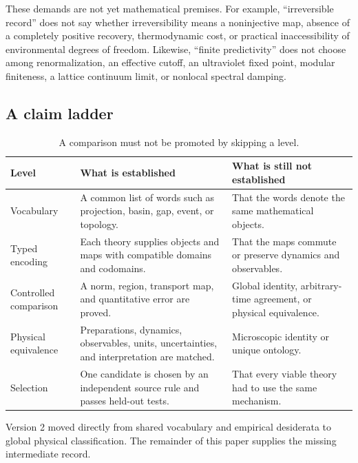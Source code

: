 \documentclass[11pt]{article}
\theoremstyle{definition}
\theoremstyle{remark}
\begin{document}
These demands are not yet mathematical premises. For example,
``irreversible record'' does not say whether irreversibility means a
noninjective map, absence of a completely positive recovery, thermodynamic cost,
or practical inaccessibility of environmental degrees of freedom. Likewise,
``finite predictivity'' does not choose among renormalization, an effective
cutoff, an ultraviolet fixed point, modular finiteness, a lattice continuum
limit, or nonlocal spectral damping.

\subsection{A claim ladder}

\begin{table}[htbp]
\centering
\small
\begin{tabularx}{\textwidth}{@{}P{0.20\textwidth}Y Y@{}}
\toprule
Level & What is established & What is still not established \\
\midrule
Vocabulary &
A common list of words such as projection, basin, gap, event, or topology. &
That the words denote the same mathematical objects. \\

Typed encoding &
Each theory supplies objects and maps with compatible domains and codomains. &
That the maps commute or preserve dynamics and observables. \\

Controlled comparison &
A norm, region, transport map, and quantitative error are proved. &
Global identity, arbitrary-time agreement, or physical equivalence. \\

Physical equivalence &
Preparations, dynamics, observables, units, uncertainties, and interpretation
are matched. &
Microscopic identity or unique ontology. \\

Selection &
One candidate is chosen by an independent source rule and passes held-out
tests. &
That every viable theory had to use the same mechanism. \\
\bottomrule
\end{tabularx}
\caption{A comparison must not be promoted by skipping a level.}
\label{tab:ladder}
\end{table}

Version 2 moved directly from shared vocabulary and empirical desiderata to
global physical classification. The remainder of this paper supplies the
missing intermediate record.
\end{document}
